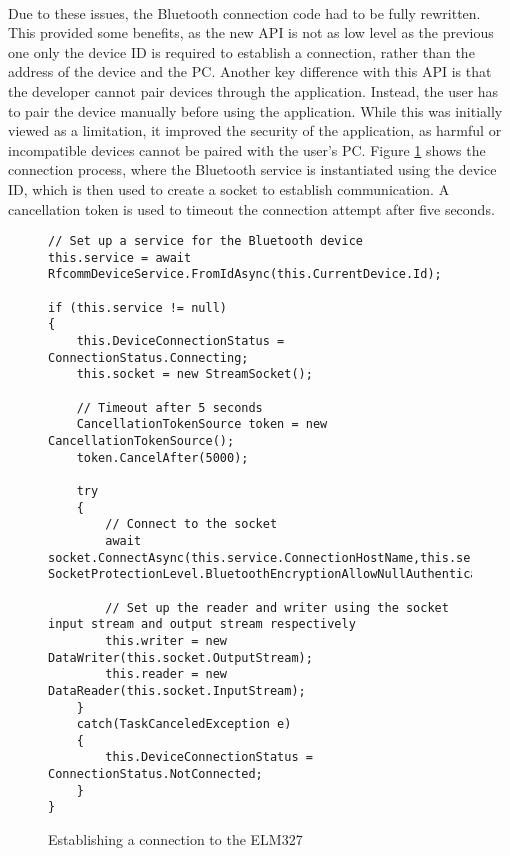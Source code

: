 		\paragraph{}{
		Due to these issues, the Bluetooth connection code had to be fully rewritten. This provided some benefits, as the new API is not as low level as the previous one only the device ID is required to establish a connection, rather than the address of the device and the PC. Another key difference with this API is that the developer cannot pair devices through the application. Instead, the user has to pair the device manually before using the application. While this was initially viewed as a limitation, it improved the security of the application, as harmful or incompatible devices cannot be paired with the user's PC. Figure \ref{code:BTConnectionInit} shows the connection process, where the Bluetooth service is instantiated using the device ID, which is then used to create a socket to establish communication. A cancellation token is used to timeout the connection attempt after five seconds.
		}
		
		\begin{figure}[h]
			\begin{lstlisting}
// Set up a service for the Bluetooth device
this.service = await RfcommDeviceService.FromIdAsync(this.CurrentDevice.Id);

if (this.service != null)
{
	this.DeviceConnectionStatus = ConnectionStatus.Connecting;
	this.socket = new StreamSocket();

	// Timeout after 5 seconds
	CancellationTokenSource token = new CancellationTokenSource();
	token.CancelAfter(5000);

	try
	{
		// Connect to the socket
		await socket.ConnectAsync(this.service.ConnectionHostName,this.service.ConnectionServiceName, SocketProtectionLevel.BluetoothEncryptionAllowNullAuthentication).AsTask(token.Token);
	
		// Set up the reader and writer using the socket input stream and output stream respectively
		this.writer = new DataWriter(this.socket.OutputStream);
		this.reader = new DataReader(this.socket.InputStream);    		
	}
	catch(TaskCanceledException e)
	{
		this.DeviceConnectionStatus = ConnectionStatus.NotConnected;                            
	}
}
			\end{lstlisting}
			\caption{Establishing a connection to the ELM327}
			\label{code:BTConnectionInit}
		\end{figure}

